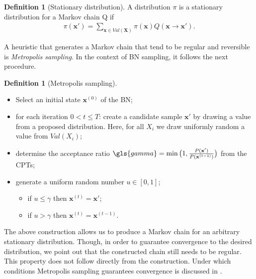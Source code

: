 \documentclass[a4paper, twoside, 11pt]{report}
\newcommand{\bfx}{{\mathbf{x}}}
\DeclarePairedDelimiter\floor{\lfloor}{\rfloor}
\theoremstyle{plain}
\theoremstyle{definition}
\newtheorem{definition}[thm]{Definition}
\theoremstyle{remark}
\newcommand{\bfX}{{\mathbf{X}}}
\begin{document}
\begin{definition}[Stationary distribution]
A distribution $\pi$ is a stationary distribution for a Markov chain Q if
\begin{align}
\pi(\bfx') = \sum_{\bfx \in Val(\bfX)} \pi(\bfx) Q(\bfx \to \bfx').
\end{align}
\end{definition}
A heuristic that generates a Markov chain that tend to be regular and reversible is \textit{Metropolis sampling}. In the context of BN sampling, it follows the next procedure.
\begin{definition}[Metropolis sampling]
\leavevmode
\makeatletter
\@nobreaktrue
\makeatother
\vspace{0.5pc}
\begin{itemize}
\item Select an initial state $\bfx^{(0)}$ of the BN;
\item for each iteration $0 < t \leq T$: create a candidate sample $\bfx'$ by drawing a value from a proposed distribution. Here, for all $X_i$ we draw uniformly random a value from $Val(X_i)$;
\item determine the acceptance ratio $\gls{gamma} = \min \big( 1, \frac{P(\bfx')}{P(\bfx^{(t-1)})} \big)$ from the CPTs;
\item generate a uniform random number $u \in [0,1]$;
\begin{itemize}
\item if $u \leq \gamma$ then $\bfx^{(t)} = \bfx'$;
\item if $u > \gamma$ then $\bfx^{(t)} = \bfx^{(t-1)}$.
\end{itemize}
\end{itemize}
The above construction allows us to produce a Markov chain for an arbitrary stationary distribution. Though, in order to guarantee convergence to the desired distribution, we point out that the constructed chain still needs to be regular. This property does not follow directly from the construction. Under which conditions Metropolis sampling guarantees convergence is discussed in \citep[p.~505]{koller2009probabilistic}.
\end{definition}
\end{document}
